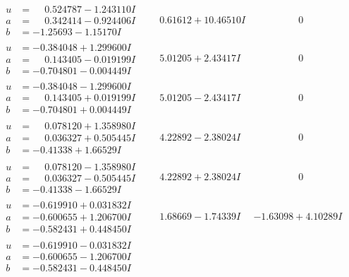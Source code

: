 \documentclass[1p]{elsarticle_modified}
\theoremstyle{definition}
\begin{document}
$$\begin{array}{c|c|c}
\begin{aligned}
u &= \phantom{-}0.524787 - 1.243110 I \\
a &= \phantom{-}0.342414 - 0.924406 I \\
b &= -1.25693 - 1.15170 I\end{aligned}
 & \phantom{-}0.61612 + 10.46510 I & \phantom{-0.000000 } 0 \\ \hline\begin{aligned}
u &= -0.384048 + 1.299600 I \\
a &= \phantom{-}0.143405 - 0.019199 I \\
b &= -0.704801 - 0.004449 I\end{aligned}
 & \phantom{-}5.01205 + 2.43417 I & \phantom{-0.000000 } 0 \\ \hline\begin{aligned}
u &= -0.384048 - 1.299600 I \\
a &= \phantom{-}0.143405 + 0.019199 I \\
b &= -0.704801 + 0.004449 I\end{aligned}
 & \phantom{-}5.01205 - 2.43417 I & \phantom{-0.000000 } 0 \\ \hline\begin{aligned}
u &= \phantom{-}0.078120 + 1.358980 I \\
a &= \phantom{-}0.036327 + 0.505445 I \\
b &= -0.41338 + 1.66529 I\end{aligned}
 & \phantom{-}4.22892 - 2.38024 I & \phantom{-0.000000 } 0 \\ \hline\begin{aligned}
u &= \phantom{-}0.078120 - 1.358980 I \\
a &= \phantom{-}0.036327 - 0.505445 I \\
b &= -0.41338 - 1.66529 I\end{aligned}
 & \phantom{-}4.22892 + 2.38024 I & \phantom{-0.000000 } 0 \\ \hline\begin{aligned}
u &= -0.619910 + 0.031832 I \\
a &= -0.600655 + 1.206700 I \\
b &= -0.582431 + 0.448450 I\end{aligned}
 & \phantom{-}1.68669 - 1.74339 I & -1.63098 + 4.10289 I \\ \hline\begin{aligned}
u &= -0.619910 - 0.031832 I \\
a &= -0.600655 - 1.206700 I \\
b &= -0.582431 - 0.448450 I\end{aligned}

\end{array}$$
\end{document}
